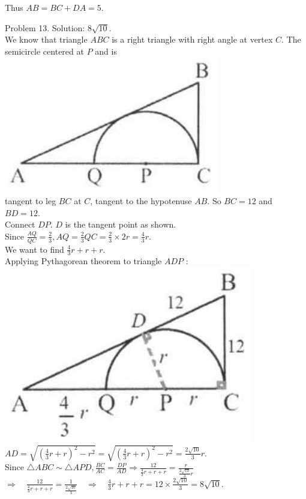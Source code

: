 \documentclass[10pt]{article}
\begin{document}
Thus \(A B=B C+D A=5\).

Problem 13. Solution: \(8 \sqrt{10}\).\\
We know that triangle \(A B C\) is a right triangle with right angle at vertex \(C\). The semicircle centered at \(P\) and is\\
\includegraphics[max width=\textwidth, center]{2025_04_17_97bc1f7e44d93c271a88g-160(2)}\\
tangent to leg \(B C\) at \(C\), tangent to the hypotenuse \(A B\). So \(B C=12\) and \(B D=12\).\\
Connect \(D P\). \(D\) is the tangent point as shown.\\
Since \(\frac{A Q}{Q C}=\frac{2}{3}, A Q=\frac{2}{3} Q C=\frac{2}{3} \times 2 r=\frac{4}{3} r\).\\
We want to find \(\frac{4}{3} r+r+r\).\\
Applying Pythagorean theorem to triangle \(A D P\) :\\
\includegraphics[max width=\textwidth, center]{2025_04_17_97bc1f7e44d93c271a88g-161(1)}\\
\(A D=\sqrt{\left(\frac{4}{3} r+r\right)^{2}-r^{2}}=\sqrt{\left(\frac{4}{3} r+r\right)^{2}-r^{2}}=\frac{2 \sqrt{10}}{3} r\).\\
Since \(\triangle A B C \sim \triangle A P D, \frac{B C}{A C}=\frac{D P}{A D} \Rightarrow \frac{12}{\frac{4}{3} r+r+r}=\frac{r}{\frac{2 \sqrt{10}}{3} r}\)\\
\(\Rightarrow \quad \frac{12}{\frac{4}{3} r+r+r}=\frac{1}{\frac{2 \sqrt{10}}{3}} \quad \Rightarrow \quad \frac{4}{3} r+r+r=12 \times \frac{2 \sqrt{10}}{3}=8 \sqrt{10}\).
\end{document}
